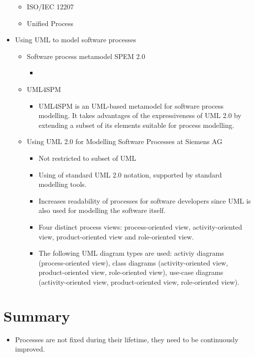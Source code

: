 \begin{itemize}
\begin{itemize}
		\item ISO/IEC 12207
		\item Unified Process
	\end{itemize}
	\item Using UML to model software processes
	\begin{itemize}
		\item Software process metamodel SPEM 2.0 \citep{Group:2008aa} 
		\begin{itemize}
			\item 
		\end{itemize}
		\item UML4SPM \citep{Bendraou:2005dv}
		\begin{itemize}
			\item UML4SPM is an \ac{UML}-based metamodel for software process modelling. It takes advantages of the expressiveness of \ac{UML} 2.0 by extending a subset of its elements suitable for process modelling.
		\end{itemize}
		\item Using UML 2.0 for Modelling Software Processes at Siemens AG \citep{Dietrich:2013aa}
		\begin{itemize}
			\item Not restricted to subset of UML
			\item Using of standard UML 2.0 notation, supported by standard modelling tools.
			\item Increases readability of processes for software developers since UML is also used for modelling the software itself.
			\item Four distinct process views: process-oriented view, activity-oriented view, product-oriented view and role-oriented view.
			\item The following UML diagram types are used: activiy diagrams (process-oriented view), class diagrams (activity-oriented view, product-oriented view, role-oriented view), use-case diagrams (activity-oriented view, product-oriented view, role-oriented view).
		\end{itemize}
	\end{itemize}
\end{itemize}

\section{Summary}

\begin{itemize}
	\item Processes are not fixed during their lifetime, they need to be continuously improved. \citep{Fuggetta:2000ds}
\end{itemize}
